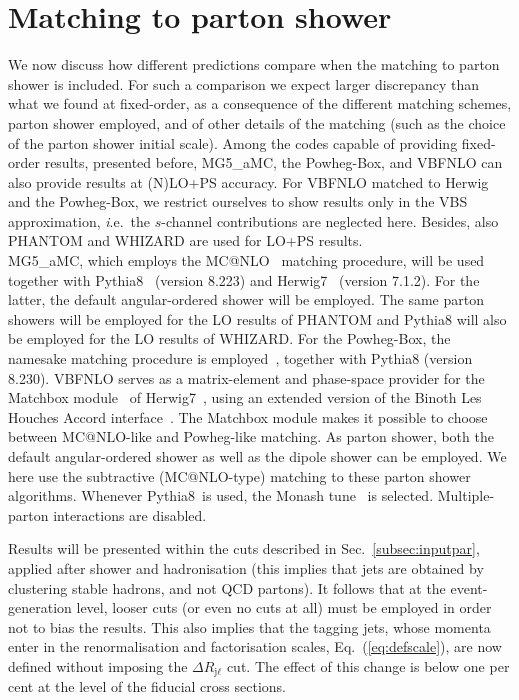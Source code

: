 \documentclass[twocolumn,epjc3]{svjour3} %
\newcommand{\Pl}{\ell}
\newcommand{\Pj}{\ensuremath{\text{j}}\xspace}
\begin{document}
\section{Matching to parton shower}
    \label{sec:matching}
We now discuss how different predictions compare when the matching to parton shower is included. For such
a comparison we expect larger discrepancy than what we found at fixed-order, as a consequence of the different
matching schemes, parton shower employed, and of other details of the matching (such as the choice of the parton shower initial scale). Among
the codes capable of providing fixed-order results, presented before, {\sc MG5\_aMC}, the {\sc Powheg-Box}, and {\sc VBFNLO}
can also provide results at (N)LO+PS accuracy. For {\sc VBFNLO} matched to {\sc Herwig} and the {\sc Powheg-Box}, we
restrict ourselves to show results only in the VBS approximation,
{\emph i.e.}\ the $s$-channel contributions are neglected here. Besides,
also {\sc PHANTOM} and {\sc WHIZARD} are used for LO+PS results.\\
{\sc MG5\_aMC}, which
employs the {\sc MC@NLO}~\cite{Frixione:2002ik} matching procedure, will be used together with {\sc Pythia8}~\cite{Sjostrand:2014zea} (version 8.223)
and {\sc Herwig7}~\cite{Bellm:2015jjp,Bellm:2017bvx} (version 7.1.2). For the latter, the default angular-ordered shower will be employed. 
The same parton showers will be employed for the LO results of {\sc PHANTOM} and {\sc Pythia8} will also be employed for the LO results of {\sc WHIZARD}. For the {\sc Powheg-Box}, the namesake
matching procedure is employed~\cite{Nason:2004rx,Frixione:2007vw}, together with {\sc Pythia8} (version 8.230). {\sc VBFNLO} serves as a matrix-element and phase-space provider
for the {\sc Matchbox} module~\cite{Platzer:2011bc} of {\sc
Herwig7}~\cite{Bellm:2015jjp,Bellm:2017bvx}, using an extended version of the Binoth Les Houches Accord
interface~\cite{Binoth:2010xt,Alioli:2013nda,Andersen:2014efa}. The {\sc Matchbox} module makes it
possible to choose between {\sc MC\-@NLO}-like and {\sc Powheg}-like
matching. As parton shower, both the default angular-ordered shower as
well as the dipole shower can be employed. We here use the subtractive (MC@NLO-type) matching to these parton shower algorithms.
Whenever {\sc Pythia8}\ is used, the Monash tune~\cite{Skands:2014pea} is selected. Multiple-parton interactions are disabled.

Results will be presented within the cuts described in Sec.~\ref{subsec:inputpar}, applied after shower and hadronisation (this implies that jets
are obtained by clustering stable hadrons, and not QCD partons). It follows that at the event-generation level, looser cuts (or even no cuts at all)
must be employed in order not to bias the results. This also implies that the tagging jets, whose momenta enter in the 
renormalisation and factorisation scales, Eq.~(\ref{eq:defscale}), are now defined without imposing
the $\Delta R_{\Pj\Pl}$ cut. The effect of this change is below one per cent at the level of the fiducial cross sections.
\end{document}
